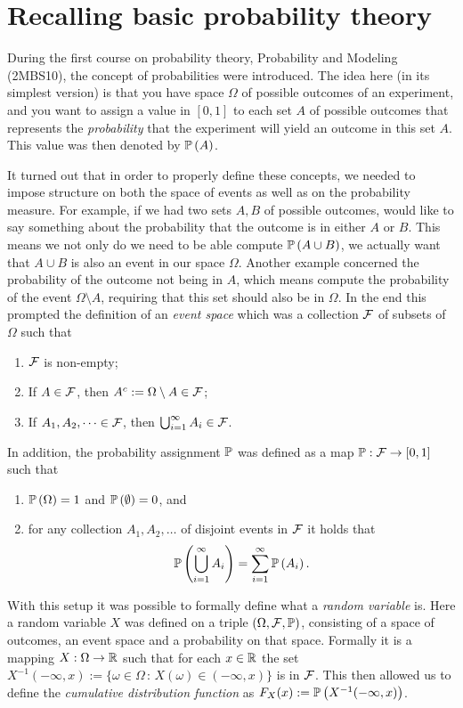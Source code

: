 
\section{Recalling basic probability theory}\label{sec:recalling_probability_theory}

During the first course on probability theory, Probability and Modeling (2MBS10), the concept of probabilities were introduced. The idea here (in its simplest version) is that you have space $\Omega$ of possible outcomes of an experiment, and you want to assign a value in $[0,1]$ to each set $A$ of possible outcomes that represents the \emph{probability} that the experiment will yield an outcome in this set $A$. This value was then denoted by $\mathbb P\left(A\right)$. 

It turned out that in order to properly define these concepts, we needed to impose structure on both the space of events as well as on the probability measure. For example, if we had two sets $A, B$ of possible outcomes, would like to say something about the probability that the outcome is in either $A$ or $B$. This means we not only do we need to be able compute $\mathbb P\left(A \cup B\right)$, we actually want that $A \cup B$ is also an event in our space $\Omega$. Another example concerned the probability of the outcome not being in $A$, which means compute the probability of the event $\Omega\setminus A$, requiring that this set should also be in $\Omega$. In the end this prompted the definition of an \emph{event space} which was a collection $\mathcal F$ of subsets of $\Omega$ such that
\begin{enumerate}
\item $\mathcal F$ is non-empty;
\item If $A \in \mathcal F$, then $A^c := \Omega \setminus A \in \mathcal F$;
\item If $A_1, A_2, \dots \in \mathcal F$, then $\bigcup_{i = 1}^\infty A_i \in \mathcal F$.
\end{enumerate}

In addition, the probability assignment $\mathbb P$ was defined as a map $\mathbb P : \mathcal F \to [0,1]$ such that
\begin{enumerate}
\item $\mathbb P\left(\Omega\right) = 1$ and $\mathbb P\left(\emptyset\right) = 0$, and
\item for any collection $A_1, A_2, \dots$ of disjoint events in $\mathcal F$ it holds that 
\[
	\mathbb P\left(\bigcup_{i = 1}^\infty A_i\right) = \sum_{i = 1}^\infty \mathbb P\left(A_i\right).
\]
\end{enumerate}

With this setup it was possible to formally define what a \emph{random variable} is. Here a random variable $X$ was defined on a triple $(\Omega, \mathcal F, \mathbb P)$, consisting of a space of outcomes, an event space and a probability on that space. Formally it is a mapping $X : \Omega \to \mathbb R$ such that for each $x \in \mathbb R$ the set $X^{-1}(-\infty,x):=\{\omega \in \Omega \, : \, X(\omega) \in (-\infty,x)\}$ is in $\mathcal F$. This then allowed us to define the \emph{cumulative distribution function} as $F_X(x) := \mathbb P\left(X^{-1}(-\infty,x)\right)$.

